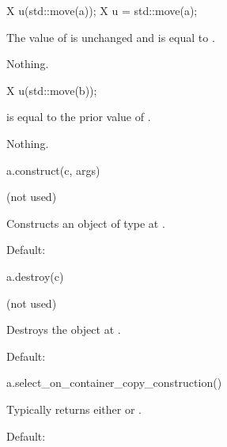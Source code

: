 \begin{itemdecl}
X u(std::move(a));
X u = std::move(a);
\end{itemdecl}

\begin{itemdescr}
\pnum
\ensures
The value of  is unchanged and is equal to .

\pnum
\throws
Nothing.
\end{itemdescr}

\begin{itemdecl}
X u(std::move(b));
\end{itemdecl}

\begin{itemdescr}
\pnum
\ensures
{} is equal to the prior value of .

\pnum
\throws
Nothing.
\end{itemdescr}

\begin{itemdecl}
a.construct(c, args)
\end{itemdecl}

\begin{itemdescr}
\pnum
\result
(not used)

\pnum
\effects
Constructs an object of type  at .

\pnum
\remarks
Default:
\end{itemdescr}

\begin{itemdecl}
a.destroy(c)
\end{itemdecl}

\begin{itemdescr}
\pnum
\result
(not used)

\pnum
\effects
Destroys the object at .

\pnum
\remarks
Default: 
\end{itemdescr}

\begin{itemdecl}
a.select_on_container_copy_construction()
\end{itemdecl}

\begin{itemdescr}
\pnum
\result
{}

\pnum
\returns
Typically returns either  or .

\pnum
\remarks
Default: 
\end{itemdescr}

